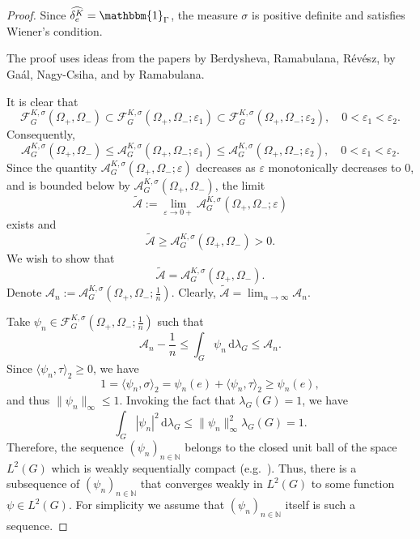 \documentclass[[a4paper,english,12pt]{amsart}
\theoremstyle{plain}
\theoremstyle{remark}
\newcommand{\NN}{\mathbb N}
\begin{document}
\begin{proof}

Since $\widehat{\delta_e^K} = \mathbbm{1}_\Gamma$, the measure $\sigma$ is positive definite and satisfies Wiener's condition. 

The proof uses ideas from the papers \cite{BRR_Expo} by Berdysheva, Ramabulana, R\'ev\'esz, \cite{marcell-zsuzsa} by Ga\'al, Nagy-Csiha, and  \cite{ramabulana} by Ramabulana.

It is clear that 
\begin{equation} \label{eq:eps_lemma_C_class_incl}
\mathcal{F}^{K,\sigma}_G(\Omega_+, \Omega_-) \subset \mathcal{F}^{K,\sigma}_G(\Omega_+, \Omega_-; \varepsilon_1) \subset \mathcal{F}^{K,\sigma}_G(\Omega_+, \Omega_-; \varepsilon_2), \quad 0 < \varepsilon_1 < \varepsilon_2.
\end{equation}
Consequently,
$$
\mathcal{A}^{K,\sigma}_G(\Omega_+, \Omega_{-}) \le \mathcal{A}^{K,\sigma}_G(\Omega_+, \Omega_-;\varepsilon_1) \le \mathcal{A}^{K,\sigma}_G(\Omega_+, \Omega_-;\varepsilon_2), \quad 0 < \varepsilon_1 < \varepsilon_2.
$$
Since the quantity $\mathcal{A}^{K,\sigma}_G(\Omega_+, \Omega_-;\varepsilon)$ decreases as $\varepsilon$ monotonically decreases to $0$, and is bounded below by $\mathcal{A}^{K,\sigma}_G(\Omega_+, \Omega_-)$, the limit
$$
\widetilde{\mathcal{A}} := \lim_{\varepsilon \to 0+} \mathcal{A}^{K,\sigma}_G(\Omega_+, \Omega_-;\varepsilon) 
$$
exists and
\begin{equation} \label{eq:A-positive}
\widetilde{\mathcal{A}} \ge \mathcal{A}^{K,\sigma}_G(\Omega_+, \Omega_{-}) > 0.
\end{equation}
We wish to show that
$$
\widetilde{\mathcal{A}} = \mathcal{A}^{K,\sigma}_G(\Omega_+, \Omega_{-}).
$$
Denote $\mathcal{A}_n := \mathcal{A}^{K,\sigma}_G \left( \Omega_+, \Omega_-;\frac{1}{n} \right)$. 
Clearly, $\widetilde{\mathcal{A}} = \lim_{n \to \infty} \mathcal{A}_n$.

Take $\psi_n \in \mathcal{F}^{K,\sigma}_G \left( \Omega_+, \Omega_-; \frac{1}{n} \right)$ such that 
\begin{equation} \label{eq:eps_lemma_C_choice_gn}
\mathcal{A}_n - \frac{1}{n} \le \int_G  \psi_n \,\mbox{d}\lambda_G\le \mathcal{A}_n.
\end{equation}
Since $\langle \psi_n, \tau \rangle_2 \ge 0$, we have
$$
1 = \langle \psi_n, \sigma \rangle_2 = \psi_n(e) + \langle \psi_n, \tau \rangle_2 \ge \psi_n(e),
$$
and thus $\|\psi_n\|_\infty \le 1$. Invoking the fact that $\lambda_G(G) = 1$, we have
$$
\int_G |\psi_n|^2 \,\mbox{d}\lambda_G \le \|\psi_n\|_\infty^2 \lambda_G(G) = 1.
$$
Therefore, the sequence $(\psi_n)_{n \in \NN}$ belongs to the closed unit ball of the space $L^2(G)$ which is weakly sequentially compact (e.g.~\cite[Theorem 3.18]{Brezis}). Thus, there is a subsequence of $(\psi_n)_{n \in \NN}$  that converges weakly in $L^2(G)$ to some function $\psi \in L^2(G)$. For simplicity we assume that $(\psi_n)_{n \in \NN}$ itself is such a sequence.


\end{proof}
\end{document}

